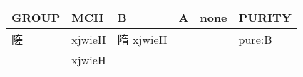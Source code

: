 \documentclass[14pt,a4paper]{scrartcl}
\begin{document}
\begin{longtable}[c]{@{}llllll@{}}
\toprule
\begin{minipage}[b]{0.14\columnwidth}\raggedright\strut
GROUP
\strut\end{minipage} &
\begin{minipage}[b]{0.14\columnwidth}\raggedright\strut
MCH
\strut\end{minipage} &
\begin{minipage}[b]{0.14\columnwidth}\raggedright\strut
B
\strut\end{minipage} &
\begin{minipage}[b]{0.14\columnwidth}\raggedright\strut
A
\strut\end{minipage} &
\begin{minipage}[b]{0.14\columnwidth}\raggedright\strut
none
\strut\end{minipage} &
\begin{minipage}[b]{0.14\columnwidth}\raggedright\strut
PURITY
\strut\end{minipage}\tabularnewline
\midrule
\endhead
\begin{minipage}[t]{0.14\columnwidth}\raggedright\strut
隓
\strut\end{minipage} &
\begin{minipage}[t]{0.14\columnwidth}\raggedright\strut
xjwieH
\strut\end{minipage} &
\begin{minipage}[t]{0.14\columnwidth}\raggedright\strut
隋 xjwieH
\strut\end{minipage} &
\begin{minipage}[t]{0.14\columnwidth}\raggedright\strut
\strut\end{minipage} &
\begin{minipage}[t]{0.14\columnwidth}\raggedright\strut
\strut\end{minipage} &
\begin{minipage}[t]{0.14\columnwidth}\raggedright\strut
pure:B
\strut\end{minipage}\tabularnewline
\begin{minipage}[t]{0.14\columnwidth}\raggedright\strut
𢀡
\strut\end{minipage} &
\begin{minipage}[t]{0.14\columnwidth}\raggedright\strut
xjwieH
\strut\end{minipage} &
\begin{minipage}[t]{0.14\columnwidth}\raggedright\strut
\strut\end{minipage} &
\begin{minipage}[t]{0.14\columnwidth}\raggedright\strut

\end{minipage}
\end{longtable}
\end{document}
